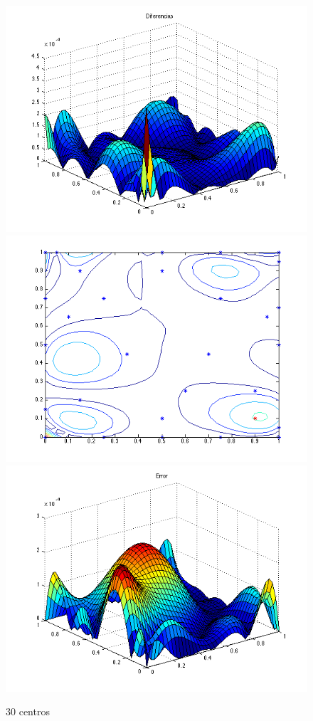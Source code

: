 \documentclass[11pt,a4paper]{article}
\begin{document}
\begin{figure}[H]
\centering

\includegraphics[scale=0.35]{diferencias30.png}
\includegraphics[scale=0.35]{centros30.png}
\includegraphics[scale=0.35]{error30.png}
\caption{30 centros}
\end{figure}
\end{document}
